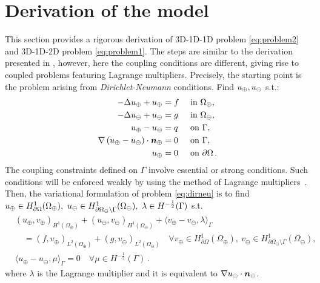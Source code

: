 
\section{Derivation of the model}\label{sec:derivation}
This section provides a rigorous derivation of 3D-1D-1D problem \eqref{eq:problem2} and 3D-1D-2D problem \eqref{eq:problem1}. 
The steps are similar to the derivation presented in \cite{laurino_m2an}, 
however, here the coupling conditions are different,
giving rise to coupled problems featuring Lagrange multipliers. 
Precisely, the starting point is the problem arising from \emph{Dirichlet-Neumann} conditions. 
Find $u_{\oplus},u_{\ominus}$ s.t.:
\begin{subequations}\label{eq:dirneu}
\begin{align}
\label{eq:dirneu1}
- \Delta \up  + \up &= f  && \text{ in } \Omega_{\oplus},\\
\label{eq:dirneu2}
- \Delta \uf  + \uf &= g  && \text{ in } \Omega_\ominus,\\
\label{eq:dirneu4}
\up - \uf &= q && \text{ on }  \Gamma,\\
\label{eq:dirneu3}
\nabla\left( \up - \uf \right) \cdot \nn_{\oplus} &=0  && \text{ on } \Gamma,\\
\label{eq:dirneu5}
\up &= 0 && \text{ on } \partial \Omega\,.
\end{align}
\end{subequations}
The coupling constraints defined on $\Gamma$ involve essential or strong conditions.
Such conditions will be enforced weakly by using the method of Lagrange multipliers~\cite{MR359352}. Then, the variational formulation of problem \eqref{eq:dirneu}
is to find $\up \in H^1_{\partial\Omega}(\Omega_\oplus), \ \uf \in H^1_{\partial\Omega_\ominus\setminus\Gamma}(\Omega_\ominus), \ \lambda \in H^{-\frac 1 2}(\Gamma)$ s.t.
\begin{subequations}\label{eq:weak_dirneu}
\begin{align}
&(u_\oplus,v_\oplus)_{H^1(\Omega_\oplus)} + (u_\ominus,v_\ominus)_{H^1(\Omega_\ominus)} 
+ \langle  v_\oplus - v_\ominus, \lambda \rangle_{\Gamma} 
\\
\nonumber
&\quad = (f,v_\oplus)_{L^2(\Omega_\oplus)} + (g,v_\ominus)_{L^2(\Omega_\ominus)}
\quad \forall v_\oplus \in H^1_{\partial\Omega}(\Omega_\oplus), \ v_\ominus \in H^1_{\partial\Omega_\ominus\setminus\Gamma}(\Omega_\ominus),
\\
& \langle u_\oplus - u_\ominus, \mu \rangle_{\Gamma} = 0
\quad \forall  \mu \in H^{-\frac 1 2}(\Gamma)\,.
\end{align}
\end{subequations}
where $\lambda$ is the Lagrange multiplier and it is equivalent to $\nabla u_{\ominus} \cdot \boldsymbol n_\ominus$.

